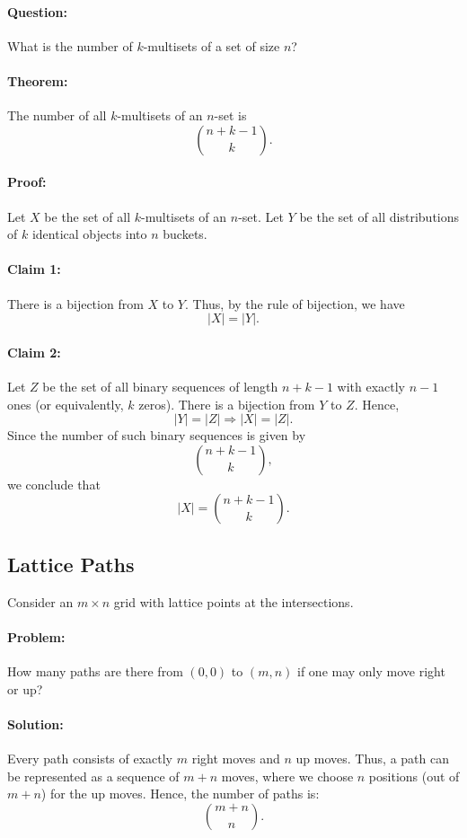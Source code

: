 \documentclass{article}
\begin{document}
\paragraph{Question:}  
What is the number of \( k \)-multisets of a set of size \( n \)?  

\paragraph{Theorem:}  
The number of all \( k \)-multisets of an \( n \)-set is  
\[
\binom{n+k-1}{k}.
\]  

\paragraph{Proof:}  
Let \( X \) be the set of all \( k \)-multisets of an \( n \)-set.  
Let \( Y \) be the set of all distributions of \( k \) identical objects into \( n \) buckets.  

\paragraph{Claim 1:}  
There is a bijection from \( X \) to \( Y \).  
Thus, by the rule of bijection, we have  
\[
|X| = |Y|.
\]  

\paragraph{Claim 2:}  
Let \( Z \) be the set of all binary sequences of length \( n+k-1 \) with exactly \( n-1 \) ones (or equivalently, \( k \) zeros).  
There is a bijection from \( Y \) to \( Z \).  
Hence,  
\[
|Y| = |Z| \Rightarrow |X| = |Z|.
\]  
Since the number of such binary sequences is given by  
\[
\binom{n+k-1}{k},
\]  
we conclude that  
\[
|X| = \binom{n+k-1}{k}.
\]


\subsection{Lattice Paths}
Consider an $m \times n$ grid with lattice points at the intersections.  
\paragraph{Problem:}  
How many paths are there from $(0,0)$ to $(m,n)$ if one may only move right or up?
\paragraph{Solution:}  
Every path consists of exactly $m$ right moves and $n$ up moves. Thus, a path can be represented as a sequence of $m+n$ moves, where we choose $n$ positions (out of $m+n$) for the up moves. Hence, the number of paths is:
\[
\binom{m+n}{n}.
\]
\end{document}
